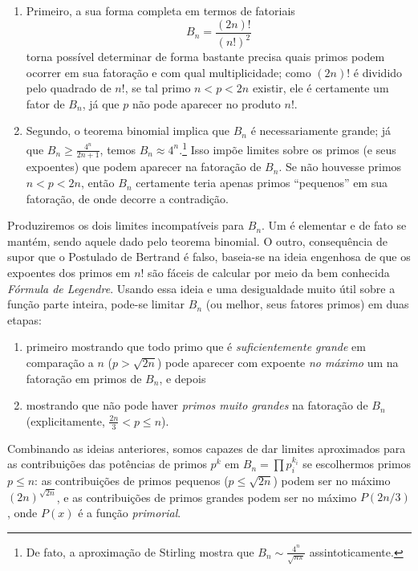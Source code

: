 \documentclass[11pt]{article}
\theoremstyle{remark}
\newcommand{\vs}{\vspace{10px}}
\begin{document}
\begin{enumerate}
    \item Primeiro, a sua forma completa em termos de fatoriais
\[
B_n=\frac{(2n)!}{(n!)^2}
\]
torna possível determinar de forma bastante precisa quais primos podem ocorrer em sua fatoração e com qual multiplicidade; como $(2n)!$ é dividido pelo quadrado de $n!$, se tal primo $n < p < 2n$ existir, ele é certamente um fator de $B_n$, já que $p$ não pode aparecer no produto $n!$. 

\item Segundo, o teorema binomial implica que $B_n$ é necessariamente grande; já que $B_n\geq \frac{4^n}{2n+1}$, temos $B_n\approx 4^n$.\footnote{De fato, a aproximação de Stirling mostra que $B_n \sim \frac{4^n}{\sqrt{n\pi}}$ assintoticamente.} Isso impõe limites sobre os primos (e seus expoentes) que podem aparecer na fatoração de $B_n$. Se não houvesse primos $n <p<2n$, então $B_n$ certamente teria apenas primos ``pequenos'' em sua fatoração, de onde decorre a contradição.
\end{enumerate}

Produziremos os dois limites incompatíveis para $B_n$. Um é elementar e de fato se mantém, sendo aquele dado pelo teorema binomial. O outro, consequência de supor que o Postulado de Bertrand é falso, baseia-se na ideia engenhosa de que os expoentes dos primos em $n!$ são fáceis de calcular por meio da bem conhecida \textit{Fórmula de Legendre}. Usando essa ideia e uma desigualdade muito útil sobre a função parte inteira, pode-se limitar $B_n$ (ou melhor, seus fatores primos) em duas etapas:
\begin{enumerate}
    \item primeiro mostrando que todo primo que é \textit{suficientemente grande} em comparação a $n$ ($p >\sqrt{2n}$) pode aparecer com expoente \textit{no máximo} um na fatoração em primos de $B_n$, e depois
    \item mostrando que não pode haver \textit{primos muito grandes} na fatoração de $B_n$ (explicitamente, $\frac{2n}3<p\le n$).
\end{enumerate}

Combinando as ideias anteriores, somos capazes de dar limites aproximados para as contribuições das potências de primos $p^k$ em $B_n=\prod p_i^{k_i}$ se escolhermos primos $p \le n$: as contribuições de primos pequenos ($p\le \sqrt{2n}$) podem ser no máximo $(2n)^{\sqrt{2n}}$, e as contribuições de primos grandes podem ser no máximo $P(2n/3)$, onde $P(x)$ é a função \textit{primorial}. 
\vs
\end{document}
